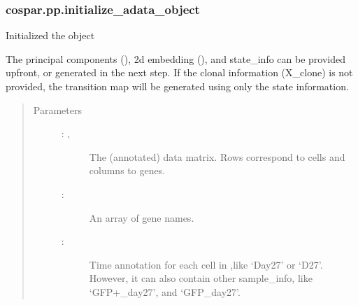 \documentclass[letterpaper,10pt,english]{sphinxmanual}
\begin{document}
\subsubsection{cospar.pp.initialize\_adata\_object}
\label{\detokenize{cospar.pp.initialize_adata_object:cospar-pp-initialize-adata-object}}\label{\detokenize{cospar.pp.initialize_adata_object::doc}}

\begin{fulllineitems}
\label{\detokenize{cospar.pp.initialize_adata_object:cospar.pp.initialize_adata_object}}
Initialized the  object

The principal components (), 2\sphinxhyphen{}d embedding (), and
state\_info can be provided upfront, or generated in the next step.
If the clonal information (X\_clone) is not provided,
the transition map will be generated using only the state information.
\begin{quote}\begin{description}
\item[{Parameters}] \leavevmode\begin{description}
\item[{ : , }] \leavevmode
The (annotated) data matrix. Rows correspond to cells and columns to genes.

\item[{ : }] \leavevmode
An array of gene names.

\item[{ : }] \leavevmode
Time annotation for each cell in ,like ‘Day27’ or ‘D27’.
However, it can also contain other sample\_info,
like ‘GFP+\_day27’, and ‘GFP\sphinxhyphen{}\_day27’.


\end{description}
\end{description}
\end{quote}
\end{fulllineitems}
\end{document}

